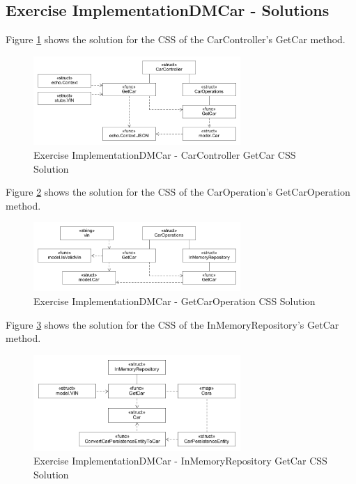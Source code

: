 \subsection*{Exercise ImplementationDMCar - Solutions}

Figure \ref{fig:m2go_carcontroller_getcar_css} shows the solution for the CSS of the CarController's GetCar method.

\begin{figure}[tb]
	\centering
	\includegraphics[width=0.7\textwidth]{figures/m2go_carcontroller_getcar_css.png}
	\caption{Exercise ImplementationDMCar - CarController GetCar CSS Solution}
	\label{fig:m2go_carcontroller_getcar_css}
\end{figure}

Figure \ref{fig:m2go_caroperations_getcar_css} shows the solution for the CSS of the CarOperation's GetCarOperation method.

\begin{figure}[tb]
	\centering
	\includegraphics[width=0.7\textwidth]{figures/m2go_caroperations_getcar_css.png}
	\caption{Exercise ImplementationDMCar - GetCarOperation CSS Solution}
	\label{fig:m2go_caroperations_getcar_css}
\end{figure}

Figure \ref{fig:m2go_inmemoryrepository_getcar_css} shows the solution for the CSS of the InMemoryRepository's GetCar method.

\begin{figure}[tb]
	\centering
	\includegraphics[width=0.7\textwidth]{figures/m2go_inmemoryrepository_getcar_css.png}
	\caption{Exercise ImplementationDMCar - InMemoryRepository GetCar CSS Solution}
	\label{fig:m2go_inmemoryrepository_getcar_css}
\end{figure}

